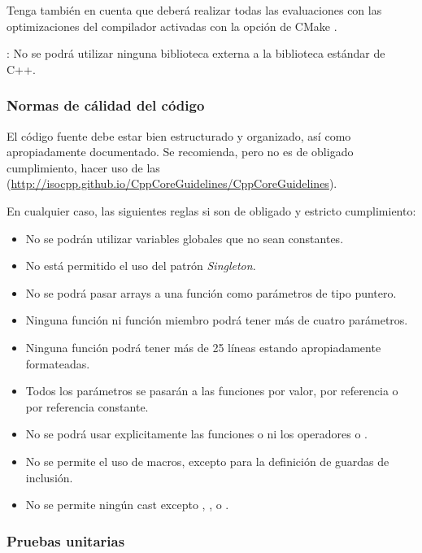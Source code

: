 Tenga también en cuenta que deberá realizar todas las evaluaciones con las
optimizaciones del compilador activadas con la opción de CMake
.


: No se podrá utilizar ninguna biblioteca externa a la 
biblioteca estándar de C++.

\subsubsection{Normas de cálidad del código}

El código fuente debe estar bien estructurado y organizado, así como
apropiadamente documentado. Se recomienda, pero no es de obligado
cumplimiento, hacer uso de las 
(\url{http://isocpp.github.io/CppCoreGuidelines/CppCoreGuidelines}).

En cualquier caso, las siguientes reglas si son de obligado y
estricto cumplimiento:

\begin{itemize}
  \item No se podrán utilizar variables globales que no sean constantes.
  \item No está permitido el uso del patrón \emph{Singleton}.
  \item No se podrá pasar arrays a una función como parámetros de tipo
        puntero.
  \item Ninguna función ni función miembro podrá tener más de cuatro parámetros.
  \item Ninguna función podrá tener más de 25 líneas estando apropiadamente
        formateadas.
  \item Todos los parámetros se pasarán a las funciones
        por valor, por referencia o por referencia constante.
  \item No se podrá usar explicitamente las funciones  o
         ni los operadores  o .
  \item No se permite el uso de macros, excepto para la definición de
        guardas de inclusión.
  \item No se permite ningún cast excepto ,
        ,  o .
\end{itemize}


\subsubsection{Pruebas unitarias}

